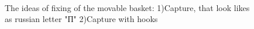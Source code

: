 \begin{enumerate}
\begin{enumerate}
\begin{enumerate}
			\begin{figure}[H]
				\begin{minipage}[h]{0.2\linewidth}
					\center  
				\end{minipage}
				\begin{minipage}[h]{0.6\linewidth}
					\caption{The ideas of fixing of the movable basket: 1)Capture, that look likes as russian letter "П" 2)Capture with hooks}
				\end{minipage}
			\end{figure}
			
		\end{enumerate}
		

\end{enumerate}
\end{enumerate}
